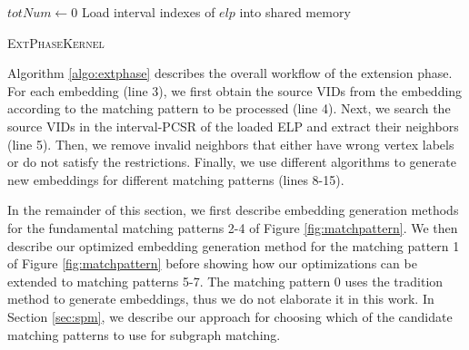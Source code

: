 \begin{algorithm}[t]
 $totNum \leftarrow 0$\; Load interval indexes of $elp$ into shared memory\; 

\caption{\textsc{ExtPhaseKernel}} \label{algo:extphase}
\end{algorithm}



Algorithm \ref{algo:extphase} describes the overall workflow of the \SystemName extension phase. For each embedding (line 3), we first
obtain the source VIDs from the embedding according to the matching pattern to be processed (line 4). Next, we search the source VIDs in
the \SystemName interval-PCSR of the loaded ELP and extract their neighbors (line 5).  Then, we remove invalid neighbors that either have wrong
vertex labels or do not satisfy the restrictions. Finally, we use different algorithms to generate new
embeddings for different matching patterns (lines 8-15).

In the remainder of this section, we first describe embedding generation methods for the fundamental matching patterns 2-4 of Figure
\ref{fig:matchpattern}. We then describe our optimized embedding generation method for the matching pattern 1 of Figure
\ref{fig:matchpattern} before showing how our optimizations can be extended to matching patterns 5-7. The matching pattern 0 uses the
tradition method to generate embeddings, thus we do not elaborate it in this work. In Section \ref{sec:spm}, we describe our approach for
choosing which of the candidate matching patterns to use for subgraph matching.

